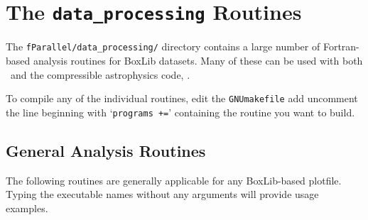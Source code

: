 \section{The {\tt data\_processing} Routines}
\label{sec:analysis}

The {\tt fParallel/data\_processing/} directory contains a large
number of Fortran-based analysis routines for BoxLib datasets.  Many
of these can be used with both \maestro\ and the compressible
astrophysics code, \castro.

To compile any of the individual routines, edit the {\tt GNUmakefile}
add uncomment the line beginning with `{\tt programs +=}' containing
the routine you want to build.

\subsection{General Analysis Routines}

The following routines are generally applicable for any BoxLib-based
plotfile.  Typing the executable names without any arguments will
provide usage examples.

